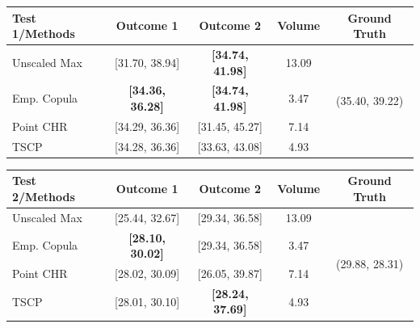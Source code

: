 \centering
\captionsetup[subtable]{justification=centering}
\small
\begin{subtable}{\linewidth}
\centering
\begin{tabular}[t]{l c c c c}
\toprule
\textbf{Test 1/Methods} 
& Outcome 1 & Outcome 2 & Volume & Ground Truth \\
\midrule
Unscaled Max & [31.70, 38.94] & \textbf{[34.74, 41.98]} & 13.09 & \multirow{4}{*}{(35.40, 39.22)} \\
Emp. Copula & \textbf{[34.36, 36.28]} & \textbf{[34.74, 41.98]} & {3.47} &\\
Point CHR & [34.29, 36.36] & [31.45, 45.27] & 7.14 &\\
TSCP & [34.28, 36.36] & [33.63, 43.08] & 4.93 &\\
\midrule
\end{tabular}
\end{subtable}

\small
\begin{subtable}{\linewidth}
\centering
\begin{tabular}[t]{l c c c c}
\midrule
\textbf{Test 2/Methods} 
& Outcome 1 & Outcome 2 & Volume & Ground Truth \\
\midrule
Unscaled Max & [25.44, 32.67] & \color{red}[29.34, 36.58] & 13.09 & \multirow{4}{*}{(29.88, 28.31)} \\
Emp. Copula & \textbf{[28.10, 30.02]} & \color{red}[29.34, 36.58] & 3.47 & \\
Point CHR & [28.02, 30.09] & [26.05, 39.87] & 7.14 & \\
TSCP & [28.01, 30.10] & \textbf{[28.24, 37.69]} & {4.93} & \\
\bottomrule
\end{tabular}
\end{subtable}
